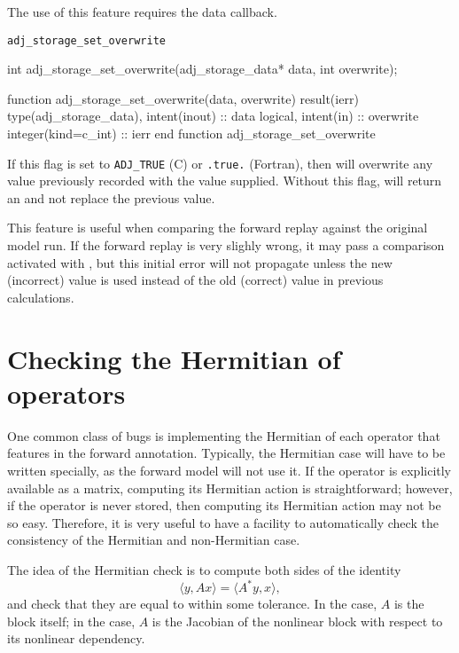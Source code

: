 The use of this feature requires the  data callback.

\begin{boxwithtitle}{\texttt{adj_storage_set_overwrite}}
\begin{minipage}{\columnwidth}
\begin{ccode}
  int adj_storage_set_overwrite(adj_storage_data* data, int overwrite);
\end{ccode}
\begin{fortrancode}
  function adj_storage_set_overwrite(data, overwrite)
           result(ierr)
    type(adj_storage_data), intent(inout) :: data
    logical, intent(in) :: overwrite
    integer(kind=c_int) :: ierr
  end function adj_storage_set_overwrite
\end{fortrancode}
\end{minipage}
\end{boxwithtitle}
If this flag is set to \texttt{ADJ_TRUE} (C) or \texttt{.true.} (Fortran),
then  will overwrite any value previously recorded
with the value supplied. Without this flag,  will
return an  and not replace the previous value.

This feature is useful when comparing the forward replay against the original
model run. If the forward replay is very slighly wrong, it may pass a comparison
activated with , but this initial error will
not propagate unless the new (incorrect) value is used instead of the old (correct)
value in previous calculations.

\section{Checking the Hermitian of operators}
One common class of bugs is implementing the Hermitian of 
each operator that features in the forward annotation. Typically,
the Hermitian case will have to be written specially, as the forward
model will not use it. If the operator is explicitly available as a matrix,
computing its Hermitian action is straightforward; however, if the operator is never
stored, then computing its Hermitian action may not be so easy. Therefore,
it is very useful to have a facility to automatically check the consistency
of the Hermitian and non-Hermitian case.

The idea of the Hermitian check is to compute both sides of the identity
\begin{equation*}
\langle y, Ax \rangle = \langle A^* y, x \rangle,
\end{equation*}
and check that they are equal to within some tolerance. In the
 case, $A$ is the block
itself; in the 
case, $A$ is the Jacobian of the nonlinear block with respect to its nonlinear
dependency.

